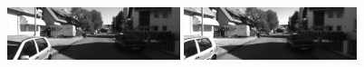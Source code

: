 \documentclass[a4paper,10pt]{article}
\begin{document}
    
\begin{figure}[h!]
  \begin{center}  
    \includegraphics[width=0.45\textwidth]{stereo_images/images0/kitti_6_left}
    \includegraphics[width=0.45\textwidth]{stereo_images/images1/kitti_6_right}
\end{center}
\end{figure}  
    
\end{document}
